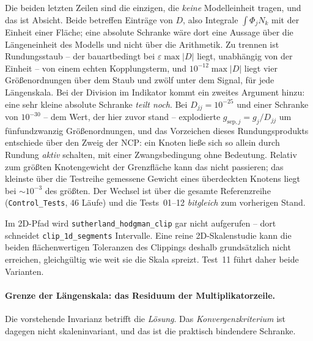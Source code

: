 \documentclass[a4paper,11pt]{article}
\def\bm#1{#1}%
\def\tilde#1{#1}%
\newcommand{\code}[1]{\texttt{\small #1}}
\newcommand{\file}[1]{\texttt{\small #1}}
\begin{document}
\noindent Die beiden letzten Zeilen sind die einzigen, die \emph{keine} Modelleinheit tragen, und
das ist Absicht. Beide betreffen Einträge von $\bm D$, also Integrale $\int\Phi_j\tilde N_k$ mit
der Einheit einer Fläche; eine absolute Schranke wäre dort eine Aussage über die Längeneinheit des
Modells und nicht über die Arithmetik. Zu trennen ist Rundungsstaub -- der bauartbedingt bei
$\varepsilon\max|\bm D|$ liegt, unabhängig von der Einheit -- von einem echten Kopplungsterm, und
$10^{-12}\max|\bm D|$ liegt vier Größenordnungen über dem Staub und zwölf unter dem Signal, für
jede Längenskala. Bei der Division im Indikator kommt ein zweites Argument hinzu: eine sehr kleine
absolute Schranke \emph{teilt noch}. Bei $\tilde D_{jj}=10^{-25}$ und einer Schranke von $10^{-30}$
-- dem Wert, der hier zuvor stand -- explodierte $g_{\text{sep},j}=\tilde g_j/\tilde D_{jj}$ um
fünfundzwanzig Größenordnungen, und das Vorzeichen dieses Rundungsprodukts entschiede über den
Zweig der NCP: ein Knoten ließe sich so allein durch Rundung \emph{aktiv} schalten, mit einer
Zwangsbedingung ohne Bedeutung. Relativ zum größten Knotengewicht der Grenzfläche kann das nicht
passieren; das kleinste über die Testreihe gemessene Gewicht eines überdeckten Knotens liegt bei
$\sim\!10^{-3}$ des größten. Der Wechsel ist über die gesamte Referenzreihe (\file{Control\_Tests},
$46$ Läufe) und die Tests~01--12 \emph{bitgleich} zum vorherigen Stand.

\noindent Im 2D-Pfad wird \code{sutherland\_hodgman\_clip} gar nicht aufgerufen -- dort schneidet
\code{clip\_1d\_segments} Intervalle. Eine reine 2D-Skalenstudie kann die beiden flächenwertigen
Toleranzen des Clippings deshalb grundsätzlich nicht erreichen, gleichgültig wie weit sie die
Skala spreizt. Test~11 führt daher beide Varianten.

\paragraph{Grenze der Längenskala: das Residuum der Multiplikatorzeile.}
\label{sec:scalelimit}
Die vorstehende Invarianz betrifft die \emph{Lösung}. Das \emph{Konvergenzkriterium} ist dagegen
nicht skaleninvariant, und das ist die praktisch bindendere Schranke.
\end{document}
